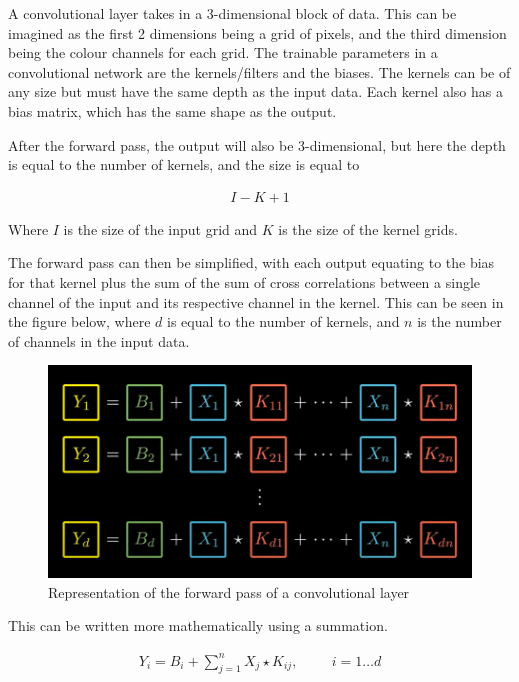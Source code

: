 \documentclass{article}
\begin{document}
    A convolutional layer takes in a 3-dimensional block of data. This can be imagined as the first 2 dimensions being a grid of pixels, and the third dimension
    being the colour channels for each grid. The trainable parameters in a convolutional network are the kernels/filters and the biases. The kernels can be of any size
    but must have the same depth as the input data. Each kernel also has a bias matrix, which has the same shape as the output.

    After the forward pass, the output will also be 3-dimensional, but here the depth is equal to the number of kernels, and the size is equal to

    \begin{align}
        I - K + 1
    \end{align}

    Where $I$ is the size of the input grid and $K$ is the size of the kernel grids.

    The forward pass can then be simplified, with each output equating to the bias for that kernel plus the sum of the sum of cross correlations between a single channel
    of the input and its respective channel in the kernel. This can be seen in the figure below, where $d$ is equal to the number of kernels, and $n$ is the number of channels in the input data.


    \pagebreak
    \begin{figure}
        \centering
        \includegraphics[scale=0.3]{ConvForwardPropIndependentCode.png}
        \caption{Representation of the forward pass of a convolutional layer}
    \end{figure}

    This can be written more mathematically using a summation.

    \begin{align}
        Y_i = B_i + \sum_{j=1}^{n}X_j \star K_{ij}, \hspace{1cm} i = 1 \dots d
    \end{align}
\end{document}
